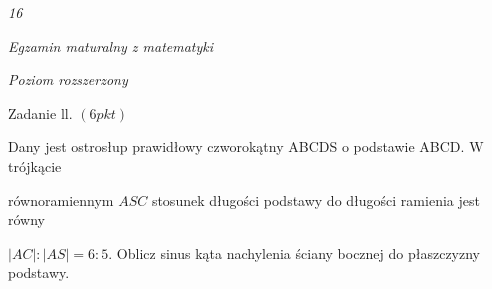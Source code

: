 \documentclass[a4paper,12pt]{article}
\begin{document}
{\it 16}

{\it Egzamin maturalny z matematyki}

{\it Poziom rozszerzony}

Zadanie ll. $(6pkt)$

Dany jest ostrosłup prawidłowy czworokątny ABCDS o podstawie ABCD. $\mathrm{W}$ trójkącie

równoramiennym $ASC$ stosunek długości podstawy do długości ramienia jest równy

$|AC|:|AS|=6:5$. Oblicz sinus kąta nachylenia ściany bocznej do płaszczyzny podstawy.
\end{document}
